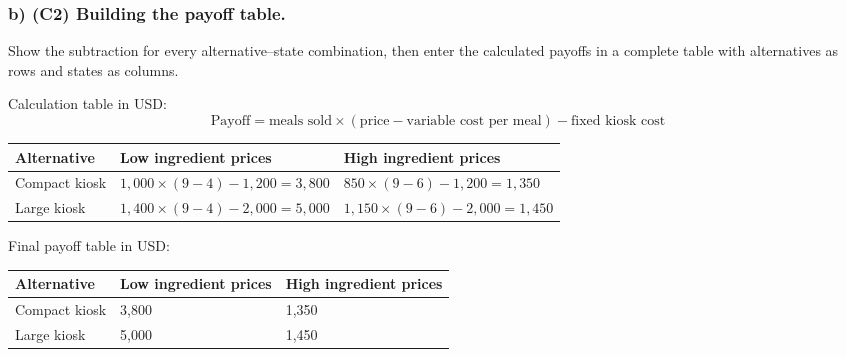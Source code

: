 \subsubsection*{b) \textbf{(C2)} Building the payoff table.}
\label{subsec:problem17-festival-snack-kiosk-c2}
Show the subtraction for every alternative--state combination, then enter the calculated payoffs in a complete table with alternatives as rows and states as columns.

Calculation table in USD:
\[
\text{Payoff}=\text{meals sold}\times(\text{price}-\text{variable cost per meal})-\text{fixed kiosk cost}
\]
\begin{center}
\small
\begin{tabular}{lll}
\toprule
Alternative & Low ingredient prices & High ingredient prices \\
\midrule
Compact kiosk & $1{,}000 \times (9 - 4) - 1{,}200 = 3{,}800$ & $850 \times (9 - 6) - 1{,}200 = 1{,}350$ \\
Large kiosk & $1{,}400 \times (9 - 4) - 2{,}000 = 5{,}000$ & $1{,}150 \times (9 - 6) - 2{,}000 = 1{,}450$ \\
\bottomrule
\end{tabular}
\end{center}

Final payoff table in USD:
\begin{center}
\begin{tabular}{lll}
\toprule
Alternative & Low ingredient prices & High ingredient prices \\
\midrule
Compact kiosk & 3{,}800 & 1{,}350 \\
Large kiosk & 5{,}000 & 1{,}450 \\
\bottomrule
\end{tabular}
\end{center}
